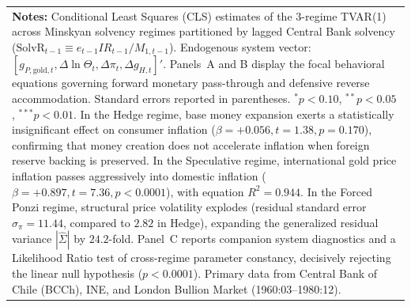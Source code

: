 \begin{table}[htbp]
\begin{tabularx}{\textwidth}{X}
\footnotesize \textbf{Notes:} Conditional Least Squares (CLS) estimates of the 3-regime TVAR(1) across Minskyan solvency regimes partitioned by lagged Central Bank solvency ($\text{SolvR}_{t-1} \equiv e_{t-1} IR_{t-1} / M_{1,t-1}$). Endogenous system vector: $[g_{P,\text{gold},t}, \Delta \ln \Theta_t, \Delta \pi_t, \Delta g_{H,t}]'$. Panels~A and B display the focal behavioral equations governing forward monetary pass-through and defensive reverse accommodation. Standard errors reported in parentheses. $^{*} p < 0.10$, $^{**} p < 0.05$, $^{***} p < 0.01$. In the Hedge regime, base money expansion exerts a statistically insignificant effect on consumer inflation ($\beta = +0.056, t = 1.38, p = 0.170$), confirming that money creation does not accelerate inflation when foreign reserve backing is preserved. In the Speculative regime, international gold price inflation passes aggressively into domestic inflation ($\beta = +0.897, t = 7.36, p < 0.0001$), with equation $R^2 = 0.944$. In the Forced Ponzi regime, structural price volatility explodes (residual standard error $\hat{\sigma}_{\pi} = 11.44$, compared to $2.82$ in Hedge), expanding the generalized residual variance $|\hat{\Sigma}|$ by $24.2$-fold. Panel~C reports companion system diagnostics and a Likelihood Ratio test of cross-regime parameter constancy, decisively rejecting the linear null hypothesis ($p < 0.0001$). Primary data from Central Bank of Chile (BCCh), INE, and London Bullion Market (1960:03--1980:12).
\end{tabularx}
\end{table}
